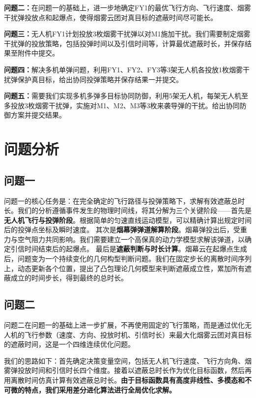 \documentclass[fontset=SimSun]{ctexart}
\begin{document}
\textbf{问题二：}在问题一的基础上，进一步地确定FY1的最优飞行方向、飞行速度、烟雾干扰弹投放点和起爆点，使得烟雾云团对真目标的遮蔽时间尽可能长。

\textbf{问题三：}无人机FY1计划投放3枚烟雾干扰弹以对M1施加干扰。我们需要制定烟雾干扰弹的投放策略，包括投弹时间以及引信时间等，计算最优遮蔽时长，并保存结果至附件中提交。

\textbf{问题四：}解决多机单弹问题，利用FY1、FY2、FY3等3架无人机各投放1枚烟雾干扰弹保护真目标，给出协同投弹策略并保存结果一并提交。

\textbf{问题五：}需要我们实现多机多弹多目标协同防御，利用5架无人机，每架无人机至多投放3枚烟雾干扰弹，实施对M1、M2、M3等3枚来袭导弹的干扰。给出协同防御方案并提交结果。
\section{问题分析}

\subsection{问题一}
问题一的核心任务是：在完全确定的飞行路径与投弹策略下，求解有效遮蔽总时长。我们的分析遵循事件发生的物理时间线，将其分解为三个关键阶段——首先是\textbf{无人机飞行与投弹阶段}。根据简单的匀速直线运动模型，可以精确计算出规定时间后的投弹点坐标及瞬时速度。
其次是\textbf{烟幕弹弹道解算阶段}。烟幕弹投出后，受重力与空气阻力共同影响。我们需要建立一个高保真的动力学模型求解该弹道，以确定引信时间结束后的起爆点。
最后是\textbf{遮蔽判断与时长计算}。烟幕云在起爆点生成后，问题变为一个持续变化的几何构型判断问题。我们在固定步长的离散时间序列上，动态更新各个位置，提出了凸包理论几何模型来判断遮蔽成立性，累加所有遮蔽成立的时间步长，得到最终的总时长。

\subsection{问题二}
问题二在问题一的基础上进一步扩展，不再使用固定的飞行策略，而是通过优化无人机的飞行参数（速度、方向、投放时机、引信时长）来最大化烟雾云团对真目标的遮蔽时间，这是一个四维连续优化问题。

我们的思路如下：首先确定决策变量空间，包括无人机飞行速度、飞行方向角、烟雾弹投放时间和引信时长四个维度。接着以遮蔽总时长作为优化目标函数，然后再用离散时间仿真计算有效遮蔽总时长。\textbf{由于目标函数具有高度非线性、多模态和不可微的特点，我们采用差分进化算法进行全局优化求解。}
\end{document}
